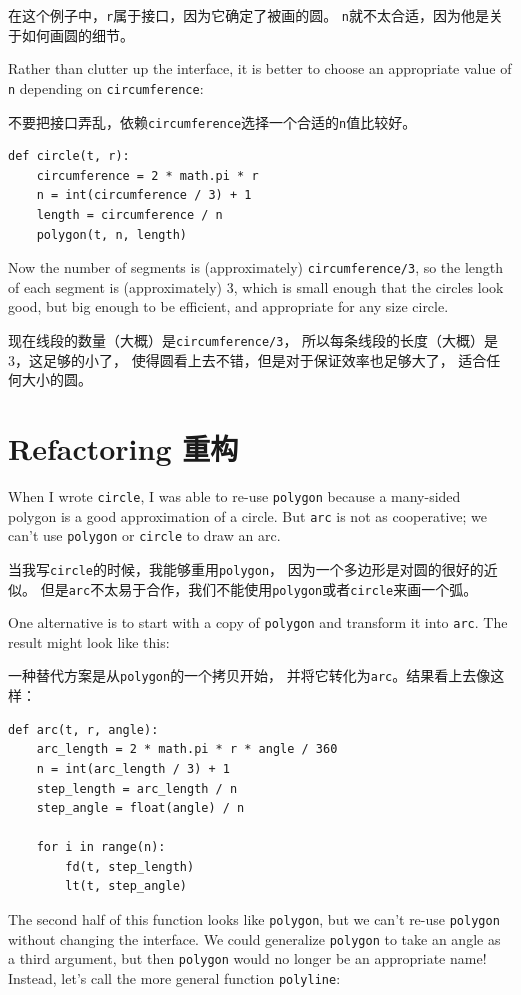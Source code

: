 \documentclass[10pt]{book}
\begin{document}
\begin{CJK}{UTF8}{gbsn}
在这个例子中，{\tt r}属于接口，因为它确定了被画的圆。
{\tt n}就不太合适，因为他是关于如何画圆的细节。

Rather than clutter up the interface, it is better
to choose an appropriate value of {\tt n}
depending on {\tt circumference}:

不要把接口弄乱，依赖{\tt circumference}选择一个合适的{\tt n}值比较好。

\begin{verbatim}
def circle(t, r):
    circumference = 2 * math.pi * r
    n = int(circumference / 3) + 1
    length = circumference / n
    polygon(t, n, length)
\end{verbatim}
%
Now the number of segments is (approximately) {\tt circumference/3},
so the length of each segment is (approximately) 3, which is small
enough that the circles look good, but big enough to be efficient,
and appropriate for any size circle.

现在线段的数量（大概）是{\tt circumference/3}，
所以每条线段的长度（大概）是3，这足够的小了，
使得圆看上去不错，但是对于保证效率也足够大了，
适合任何大小的圆。

\section{Refactoring 重构}
\label{refactoring}

When I wrote {\tt circle}, I was able to re-use {\tt polygon}
because a many-sided polygon is a good approximation of a circle.
But {\tt arc} is not as cooperative; we can't use {\tt polygon}
or {\tt circle} to draw an arc.

当我写{\tt circle}的时候，我能够重用{\tt polygon}，
因为一个多边形是对圆的很好的近似。
但是{\tt arc}不太易于合作，我们不能使用{\tt polygon}或者{\tt circle}来画一个弧。

One alternative is to start with a copy
of {\tt polygon} and transform it into {\tt arc}.  The result
might look like this:

一种替代方案是从{\tt polygon}的一个拷贝开始，
并将它转化为{\tt arc}。结果看上去像这样：

\begin{verbatim}
def arc(t, r, angle):
    arc_length = 2 * math.pi * r * angle / 360
    n = int(arc_length / 3) + 1
    step_length = arc_length / n
    step_angle = float(angle) / n
    
    for i in range(n):
        fd(t, step_length)
        lt(t, step_angle)
\end{verbatim}
%
The second half of this function looks like {\tt polygon}, but we
can't re-use {\tt polygon} without changing the interface.  We could
generalize {\tt polygon} to take an angle as a third argument,
but then {\tt polygon} would no longer be an appropriate name!
Instead, let's call the more general function {\tt polyline}:


\end{CJK}
\end{document}
